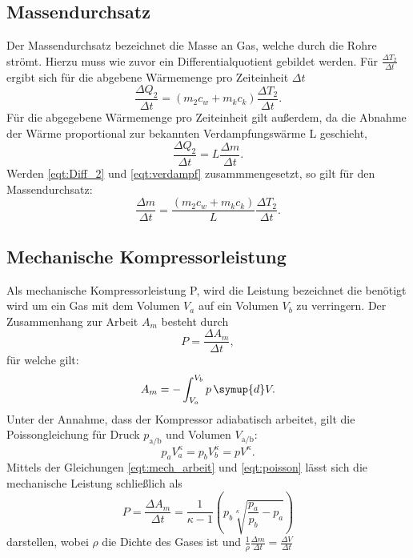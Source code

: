   \subsection{Massendurchsatz}
    Der Massendurchsatz bezeichnet die Masse an Gas, welche durch die Rohre strömt.
    Hierzu muss wie zuvor ein Differentialquotient gebildet werden. Für $\frac {\Delta T_2}{\Delta t}$ ergibt sich für die abgebene Wärmemenge pro Zeiteinheit $\Delta t$
    \begin{equation}
      \label{eqt:Diff_2}
      \frac {\Delta Q_2} {\Delta t} = (m_2 c_w + m_k c_k) \frac {\Delta T_2} {\Delta t}.
    \end{equation}
    Für die abgegebene Wärmemenge pro Zeiteinheit gilt außerdem, da die Abnahme der Wärme proportional zur bekannten Verdampfungswärme L geschieht, 
    \begin{equation}
      \label{eqt:verdampf}
      \frac {\Delta Q_2}{\Delta t} = L \frac {\Delta m} {\Delta t} .
    \end{equation}
    Werden \eqref {eqt:Diff_2} und \eqref {eqt:verdampf} zusammmengesetzt, so gilt für den Massendurchsatz:
    \begin{equation}
      \label{eqt:massendurchsatz}
      \frac {\Delta m} {\Delta t} = \frac {(m_2 c_w + m_k c_k)}{L} \frac {\Delta T_2} {\Delta t} .
    \end{equation}

  \subsection{Mechanische Kompressorleistung}
    Als mechanische Kompressorleistung P, wird die Leistung bezeichnet die benötigt wird um ein Gas mit dem Volumen $V_a$ auf ein Volumen $V_b$ zu verringern.
    Der Zusammenhang zur Arbeit $A_m$ besteht durch
    \begin{equation}
      P = \frac {\Delta A_m} {\Delta t},
    \end{equation}
    für welche gilt:
    \begin{equation}
      \label{eqt:mech_arbeit}
      A_m = - \int_{V_a}^{V_b} p \, \symup{d}V .
    \end{equation}
    Unter der Annahme, dass der Kompressor adiabatisch arbeitet, gilt die Poissongleichung für Druck $p_\text{a/b}$ und Volumen $V_\text{a/b}$:
    \begin{equation}
      \label{eqt:poisson}
      p_a V_a^\kappa = p_b V_b^\kappa = p V^\kappa .
    \end{equation}
    Mittels der Gleichungen \eqref {eqt:mech_arbeit} und \eqref {eqt:poisson} lässt sich die mechanische Leistung schließlich als
    \begin{equation}
      \label{eqt:mech_leistung}
      P = \frac {\Delta A_m} {\Delta t} = \frac {1}{\kappa -1} (p_b \sqrt[\kappa]{\frac{p_a}{p_b} - p_a } )  
    \end{equation}  
    darstellen, wobei $\rho$ die Dichte des Gases ist und $\frac {1}{\rho} \frac {\Delta m} {\Delta t} = \frac {\Delta V}{\Delta t}$